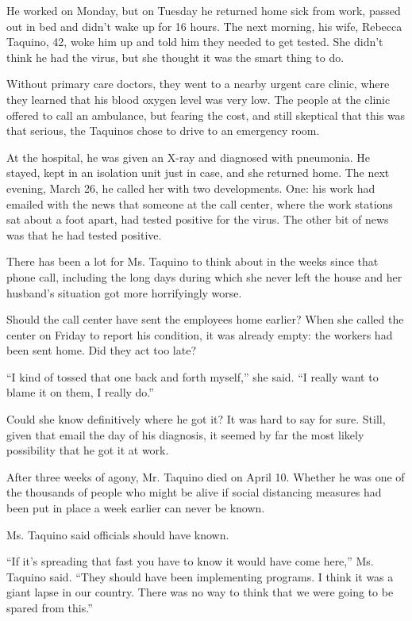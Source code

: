 He worked on Monday, but on Tuesday he returned home sick from work,
passed out in bed and didn't wake up for 16 hours. The next morning, his
wife, Rebecca Taquino, 42, woke him up and told him they needed to get
tested. She didn't think he had the virus, but she thought it was the
smart thing to do.

Without primary care doctors, they went to a nearby urgent care clinic,
where they learned that his blood oxygen level was very low. The people
at the clinic offered to call an ambulance, but fearing the cost, and
still skeptical that this was that serious, the Taquinos chose to drive
to an emergency room.

At the hospital, he was given an X-ray and diagnosed with pneumonia. He
stayed, kept in an isolation unit just in case, and she returned home.
The next evening, March 26, he called her with two developments. One:
his work had emailed with the news that someone at the call center,
where the work stations sat about a foot apart, had tested positive for
the virus. The other bit of news was that he had tested positive.

There has been a lot for Ms. Taquino to think about in the weeks since
that phone call, including the long days during which she never left the
house and her husband's situation got more horrifyingly worse.

Should the call center have sent the employees home earlier? When she
called the center on Friday to report his condition, it was already
empty: the workers had been sent home. Did they act too late?

``I kind of tossed that one back and forth myself,'' she said. ``I
really want to blame it on them, I really do.''

Could she know definitively where he got it? It was hard to say for
sure. Still, given that email the day of his diagnosis, it seemed by far
the most likely possibility that he got it at work.

After three weeks of agony, Mr. Taquino died on April 10. Whether he was
one of the thousands of people who might be alive if social distancing
measures had been put in place a week earlier can never be known.

Ms. Taquino said officials should have known.

``If it's spreading that fast you have to know it would have come
here,'' Ms. Taquino said. ``They should have been implementing programs.
I think it was a giant lapse in our country. There was no way to think
that we were going to be spared from this.''


